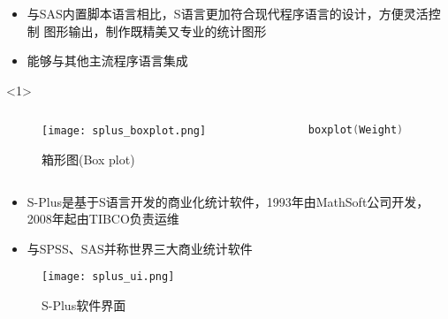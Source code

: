 \begin{frame}[t, fragile]{\subsecname}{\subsubsecname}
    \begin{itemize}
      \item 与SAS内置脚本语言相比，S语言更加符合现代程序语言的设计，方便灵活控制
            图形输出，制作既精美又专业的统计图形
      \item 能够与其他主流程序语言集成
    \end{itemize}

    \begin{onlyenv}<1>
      \begin{columns}
        \begin{column}{.7\textwidth}
          \begin{figure}
            \centering
            \texttt{[image: splus\_boxplot.png]}
            \caption{箱形图(Box plot)}
          \end{figure}
        \end{column}

        \begin{column}{.3\textwidth}
\begin{lstlisting}[language=S]
  boxplot(Weight)
\end{lstlisting}
        \end{column}
      \end{columns}
    \end{onlyenv}
\end{frame}    

\begin{frame}[t]{\subsecname}{\subsubsecname}
    \begin{itemize}
      \item S-Plus是基于S语言开发的商业化统计软件，1993年由MathSoft公司开发，
            2008年起由TIBCO负责运维
      \item 与SPSS、SAS并称世界三大商业统计软件
    \end{itemize}

    \begin{figure}
      \centering \texttt{[image: splus\_ui.png]}
      \caption{S-Plus软件界面}
    \end{figure}
\end{frame}    

